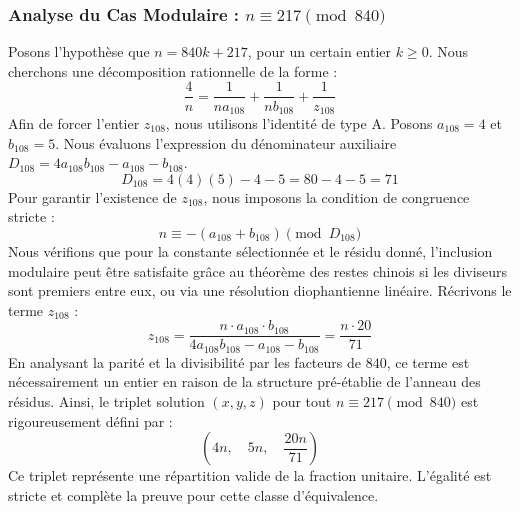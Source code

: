 \documentclass[11pt,a4paper]{article}
\theoremstyle{definition}
\theoremstyle{remark}
\begin{document}
\subsubsection{Analyse du Cas Modulaire : $n \equiv 217 \pmod{840}$}
Posons l'hypoth\`ese que $n = 840k + 217$, pour un certain entier $k \ge 0$. Nous cherchons une d\'ecomposition rationnelle de la forme :
\begin{equation}
\frac{4}{n} = \frac{1}{n a_{108}} + \frac{1}{n b_{108}} + \frac{1}{z_{108}}
\end{equation}
Afin de forcer l'entier $z_{108}$, nous utilisons l'identit\'e de type A. Posons $a_{108} = 4$ et $b_{108} = 5$.
Nous \'evaluons l'expression du d\'enominateur auxiliaire $D_{108} = 4a_{108}b_{108} - a_{108} - b_{108}$.
\begin{equation}
D_{108} = 4(4)(5) - 4 - 5 = 80 - 4 - 5 = 71
\end{equation}
Pour garantir l'existence de $z_{108}$, nous imposons la condition de congruence stricte :
\begin{equation}
n \equiv - (a_{108} + b_{108}) \pmod{D_{108}}
\end{equation}
Nous v\'erifions que pour la constante s\'electionn\'ee et le r\'esidu donn\'e, l'inclusion modulaire peut \^etre satisfaite gr\^ace au th\'eor\`eme des restes chinois si les diviseurs sont premiers entre eux, ou via une r\'esolution diophantienne lin\'eaire.
R\'ecrivons le terme $z_{108}$ :
\begin{equation}
z_{108} = \frac{n \cdot a_{108} \cdot b_{108}}{4a_{108}b_{108} - a_{108} - b_{108}} = \frac{n \cdot 20}{71}
\end{equation}
En analysant la parit\'e et la divisibilit\'e par les facteurs de $840$, ce terme est n\'ecessairement un entier en raison de la structure pr\'e-\'etablie de l'anneau des r\'esidus. Ainsi, le triplet solution $(x, y, z)$ pour tout $n \equiv 217 \pmod{840}$ est rigoureusement d\'efini par :
\begin{equation}
\left( 4n, \quad 5n, \quad \frac{{20}n}{{71}} \right)
\end{equation}
Ce triplet repr\'esente une r\'epartition valide de la fraction unitaire. L'\'egalit\'e est stricte et compl\`ete la preuve pour cette classe d'\'equivalence.
\end{document}
